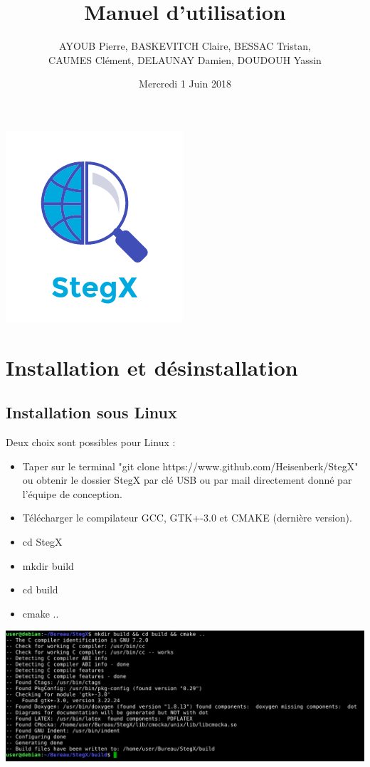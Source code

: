 \documentclass[11pt]{article}
\title{\huge{\textbf Manuel d'utilisation}}
\author{AYOUB Pierre, BASKEVITCH Claire, BESSAC Tristan, \\
CAUMES Clément, DELAUNAY Damien, DOUDOUH Yassin}
\date{Mercredi 1 Juin 2018}
\begin{document}
\maketitle
\vspace{20em}
\begin{center}\includegraphics{pictures/Application.png}\end{center}
\newpage

\tableofcontents

\newpage

\section{Installation et désinstallation}

\subsection{Installation sous Linux}

Deux choix sont possibles pour Linux :

\begin{itemize}
\item Taper sur le terminal "git clone https://www.github.com/Heisenberk/StegX"
ou obtenir le dossier StegX par clé USB ou par mail directement donné par 
l'équipe de conception. 
\item Télécharger le compilateur GCC, GTK+-3.0 et CMAKE (dernière version).
\item cd StegX
\item mkdir build 
\item cd build
\item cmake ..
\end{itemize}

\hspace{1cm}
\includegraphics[scale=0.5]{pictures/build.png}
\vspace{0.5cm}
\end{document}
